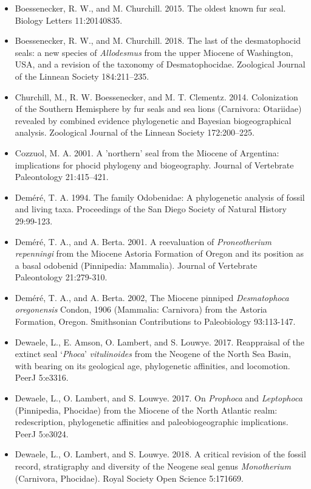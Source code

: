 \documentclass[a4paper, 12pt]{article}
\begin{document}
\begin{itemize}
\item Boessenecker, R. W., and M. Churchill. 2015. The oldest known fur seal. Biology Letters 11:20140835.
\item Boessenecker, R. W., and M. Churchill. 2018. The last of the desmatophocid seals: a new species of \textit{Allodesmus} from the upper Miocene of Washington, USA, and a revision of the taxonomy of Desmatophocidae. Zoological Journal of the Linnean Society 184:211–235.
\item Churchill, M., R. W. Boessenecker, and M. T. Clementz. 2014. Colonization of the Southern Hemisphere by fur seals and sea lions (Carnivora: Otariidae) revealed by combined evidence phylogenetic and Bayesian biogeographical analysis. Zoological Journal of the Linnean Society 172:200–225.
\item Cozzuol, M. A. 2001. A 'northern' seal from the Miocene of Argentina: implications for phocid phylogeny and biogeography. Journal of Vertebrate Paleontology 21:415–421.
\item Dem\'{e}r\'{e}, T. A. 1994. The family Odobenidae: A phylogenetic analysis of fossil and living taxa. Proceedings of the San Diego Society of Natural History 29:99-123. 
\item Dem\'{e}r\'{e}, T. A., and A. Berta. 2001. A reevaluation of \textit{Proneotherium repenningi} from the Miocene Astoria Formation of Oregon and its position as a basal odobenid (Pinnipedia: Mammalia). Journal of Vertebrate Paleontology 21:279-310. 
\item Dem\'{e}r\'{e}, T. A., and A. Berta. 2002, The Miocene pinniped \textit{Desmatophoca oregonensis} Condon, 1906 (Mammalia: Carnivora) from the Astoria Formation, Oregon. Smithsonian Contributions to Paleobiology 93:113-147. 
\item Dewaele, L., E. Amson, O. Lambert, and S. Louwye. 2017. Reappraisal of the extinct seal `\textit{Phoca}' \textit{vitulinoides} from the Neogene of the North Sea Basin, with bearing on its geological age, phylogenetic affinities, and locomotion. PeerJ 5:e3316.
\item Dewaele, L., O. Lambert, and S. Louwye. 2017. On \textit{Prophoca} and \textit{Leptophoca} (Pinnipedia, Phocidae) from the Miocene of the North Atlantic realm: redescription, phylogenetic affinities and paleobiogeographic implications. PeerJ 5:e3024. 
\item Dewaele, L., O. Lambert, and S. Louwye. 2018. A critical revision of the fossil record, stratigraphy and diversity of the Neogene seal genus \textit{Monotherium} (Carnivora, Phocidae). Royal Society Open Science 5:171669.

\end{itemize}
\end{document}
